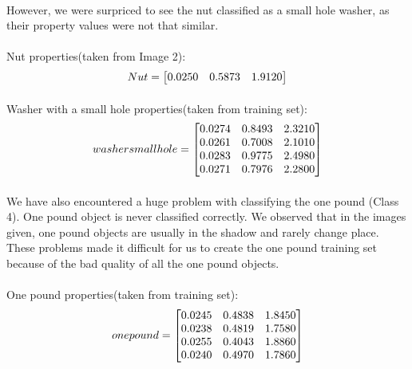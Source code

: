 \documentclass[11pt]{article}
\begin{document}
\paragraph{}
However, we were surpriced to see the nut classified as a small hole washer, as their property values were not that similar.
\paragraph{}
Nut properties(taken from Image 2):
\[
Nut = 
	\setcounter{MaxMatrixCols}{3}
	\begin{bmatrix}
	0.0250 & 0.5873 & 1.9120\\
	\end{bmatrix}
\]
\paragraph{}
Washer with a small hole properties(taken from training set):
\[
washer small hole = 
	\setcounter{MaxMatrixCols}{3}
	\begin{bmatrix}
	0.0274 & 0.8493 & 2.3210\\
	0.0261 & 0.7008 & 2.1010\\
	0.0283 & 0.9775 & 2.4980\\
	0.0271 & 0.7976 & 2.2800\\
	\end{bmatrix}
\]
\paragraph{}
We have also encountered a huge problem with classifying the one pound (Class 4). One pound object is never classified correctly. We observed that in the images given, one pound objects are usually in the shadow and rarely change place. These problems made it difficult for us to create the one pound training set because of the bad quality of all the one pound objects.
\paragraph{}
One pound properties(taken from training set):
\[
one pound = 
	\setcounter{MaxMatrixCols}{3}
	\begin{bmatrix}
	0.0245 & 0.4838 & 1.8450\\
	0.0238 & 0.4819 & 1.7580\\
	0.0255 & 0.4043 & 1.8860\\
	0.0240 & 0.4970 & 1.7860\\
	\end{bmatrix}
\]
\end{document}

